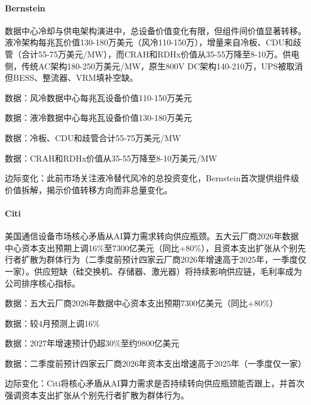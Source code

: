 \documentclass[11pt]{ctexart}
\begin{document}
\paragraph{Bernstein} 数据中心冷却与供电架构演进中，总设备价值变化有限，但组件间价值显著转移。液冷架构每兆瓦价值130-180万美元（风冷110-150万），增量来自冷板、CDU和歧管（合计55-75万美元/MW），而CRAH和RDHx价值从35-55万降至8-10万。供电侧，传统AC架构180-250万美元/MW，原生800V DC架构140-210万，UPS被取消但BESS、整流器、VRM填补空缺。
{\small\color{refgray}数据：风冷数据中心每兆瓦设备价值110-150万美元\par}
{\small\color{refgray}数据：液冷数据中心每兆瓦设备价值130-180万美元\par}
{\small\color{refgray}数据：冷板、CDU和歧管合计55-75万美元/MW\par}
{\small\color{refgray}数据：CRAH和RDHx价值从35-55万降至8-10万美元/MW\par}
{\small\color{refgray}边际变化：此前市场关注液冷替代风冷的总投资变化，Bernstein首次提供组件级价值拆解，揭示价值转移方向而非总量变化。\par}
\paragraph{Citi} 美国通信设备市场核心矛盾从AI算力需求转向供应瓶颈。五大云厂商2026年数据中心资本支出预期上调16\%至7300亿美元（同比+80\%），且资本支出扩张从个别先行者扩散为群体行为（二季度前预计四家云厂商2026年增速高于2025年，一季度仅一家）。供应短缺（硅交换机、存储器、激光器）将持续影响供应链，毛利率成为公司排序核心指标。
{\small\color{refgray}数据：五大云厂商2026年数据中心资本支出预期7300亿美元（同比+80\%）\par}
{\small\color{refgray}数据：较4月预测上调16\%\par}
{\small\color{refgray}数据：2027年增速预计仍超30\%至约9800亿美元\par}
{\small\color{refgray}数据：二季度前预计四家云厂商2026年资本支出增速高于2025年（一季度仅一家）\par}
{\small\color{refgray}边际变化：Citi将核心矛盾从AI算力需求是否持续转向供应瓶颈能否跟上，并首次强调资本支出扩张从个别先行者扩散为群体行为。\par}
\end{document}
